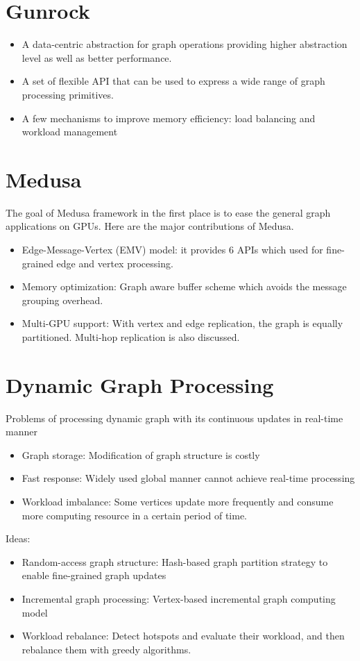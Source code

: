 \section{Gunrock}
\begin{itemize}
    \item A data-centric abstraction for graph operations providing higher abstraction level as well as better performance.
    \item A set of flexible API that can be used to express a wide range of graph processing primitives.
    \item A few mechanisms to improve memory efficiency: load balancing and workload management
\end{itemize}

\section{Medusa}
The goal of Medusa framework in the first place is to ease the general graph applications on GPUs.
Here are the major contributions of Medusa.
\begin{itemize}
    \item Edge-Message-Vertex (EMV) model: it provides 6 APIs which used for fine-grained edge and vertex processing.
    \item Memory optimization: Graph aware buffer scheme which avoids the message grouping overhead. 
    \item Multi-GPU support: With vertex and edge replication, the graph is equally partitioned. Multi-hop replication is also discussed. 
\end{itemize}

\section{Dynamic Graph Processing}
Problems of processing dynamic graph with its continuous updates in real-time manner
\begin{itemize}
\item Graph storage: Modification of graph structure is costly
\item Fast response: Widely used global manner cannot achieve real-time processing
\item Workload imbalance: Some vertices update more frequently and consume more computing resource in a certain period of time.
\end{itemize}

Ideas:
\begin{itemize}
\item Random-access graph structure: Hash-based graph partition strategy to enable fine-grained graph updates
\item Incremental graph processing: Vertex-based incremental graph computing model
\item Workload rebalance: Detect hotspots and evaluate their workload, and then rebalance them with greedy algorithms.
\end{itemize}
